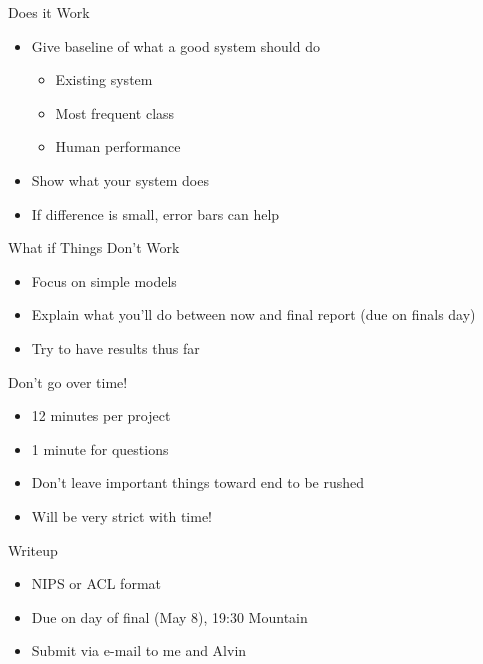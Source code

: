 \documentclass[compress]{beamer}
\begin{document}
\begin{frame}{Does it Work}

  \begin{itemize}
    \item Give baseline of what a good system should do
      \begin{itemize}
        \item Existing system
        \item Most frequent class
        \item Human performance
      \end{itemize}
    \item Show what your system does
    \item If difference is small, error bars can help
  \end{itemize}

\end{frame}

\begin{frame}{What if Things Don't Work}

  \begin{itemize}
    \item Focus on simple models 
    \item Explain what you'll do between now and final report (due on finals day)
    \item Try to have results thus far
  \end{itemize}

\end{frame}



\begin{frame}{Don't go over time!}

  \begin{itemize}
    \item 12 minutes per project
    \item 1 minute for questions
    \item Don't leave important things toward end to be rushed
    \item Will be very strict with time!
  \end{itemize}

\end{frame}

\begin{frame}{Writeup}

  \begin{itemize}
    \item NIPS or ACL format
    \item Due on day of final (May 8), 19:30 Mountain
    \item Submit via e-mail to me and Alvin
  \end{itemize}

\end{frame}
\end{document}
